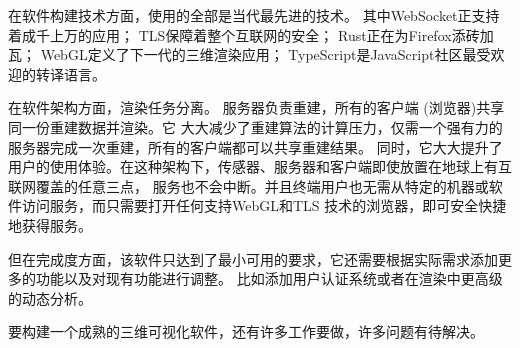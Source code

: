 在软件构建技术方面，使用的全部是当代最先进的技术。
其中WebSocket正支持着成千上万的应用；
TLS保障着整个互联网的安全；
Rust正在为Firefox添砖加瓦；
WebGL定义了下一代的三维渲染应用；
TypeScript是JavaScript社区最受欢迎的转译语言。

在软件架构方面，渲染任务分离。
服务器负责重建，所有的客户端 (浏览器)共享同一份重建数据并渲染。它
大大减少了重建算法的计算压力，仅需一个强有力的服务器完成一次重建，所有的客户端都可以共享重建结果。 
同时，它大大提升了用户的使用体验。在这种架构下，传感器、服务器和客户端即使放置在地球上有互联网覆盖的任意三点，
服务也不会中断。并且终端用户也无需从特定的机器或软件访问服务，而只需要打开任何支持WebGL和TLS
技术的浏览器，即可安全快捷地获得服务。

但在完成度方面，该软件只达到了最小可用的要求，它还需要根据实际需求添加更多的功能以及对现有功能进行调整。
比如添加用户认证系统或者在渲染中更高级的动态分析。

要构建一个成熟的三维可视化软件，还有许多工作要做，许多问题有待解决。
